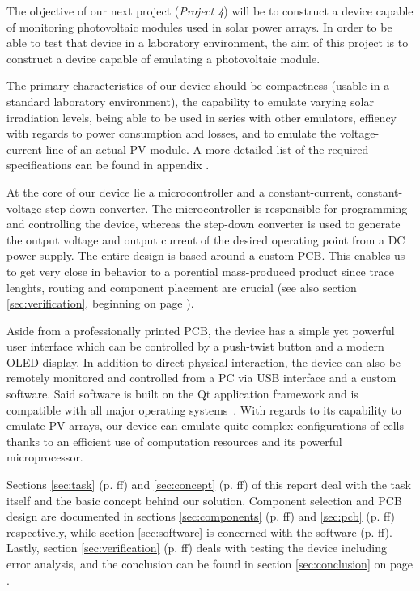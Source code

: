 
The objective  of our next project  (\emph{Project 4}) will be  to construct a
device  capable  of  monitoring  photovoltaic  modules  used  in  solar  power
arrays. In order to  be able to test that device  in a laboratory environment,
the  aim of  this project  is to  construct a  device capable  of emulating  a
photovoltaic module.

The primary characteristics  of our device should be compactness  (usable in a
standard  laboratory environment),  the  capability to  emulate varying  solar
irradiation levels,  being able  to be  used in  series with  other emulators,
effiency with  regards to  power consumption  and losses,  and to  emulate the
voltage-current  line  of  an  actual  PV  module. A  more  detailed  list  of
the  required specifications  can  be  found in  appendix  . %

At  the core  of  our device  lie a  microcontroller  and a  constant-current,
constant-voltage step-down converter.  The  microcontroller is responsible for
programming and  controlling the  device, whereas  the step-down  converter is
used  to  generate the  output  voltage  and  output  current of  the  desired
operating point  from a DC power  supply. The entire design is  based around a
custom  PCB. This enables  us to  get very  close in  behavior to  a porential
mass-produced  product since  trace lenghts,  routing and  component placement
are  crucial  (see  also  section \ref{sec:verification},  beginning  on  page
\pageref{sec:verification}).

Aside from a professionally printed PCB,  the device has a simple yet powerful
user interface  which can be  controlled by a  push-twist button and  a modern
OLED display. In addition to direct  physical interaction, the device can also
be remotely monitored and controlled from a  PC via USB interface and a custom
software. Said  software is  built  on  the Qt  application  framework and  is
compatible with all major operating systems~\cite{ref:qt}. With regards to its
capability  to  emulate  PV  arrays,  our device  can  emulate  quite  complex
configurations of  cells thanks to  an efficient use of  computation resources
and its powerful microprocessor.

Sections  \ref{sec:task}   (p.  \pageref{sec:task}ff)   and  \ref{sec:concept}
(p.   \pageref{sec:concept}ff)   of   this   report   deal   with   the   task
itself  and  the  basic   concept  behind  our  solution. Component  selection
and   PCB  design   are  documented   in  sections   \ref{sec:components}  (p.
\pageref{sec:components}ff)   and   \ref{sec:pcb}   (p.   \pageref{sec:pcb}ff)
respectively, while section \ref{sec:software}  is concerned with the software
(p.  \pageref{sec:software}ff).   Lastly, section  \ref{sec:verification}  (p.
\pageref{sec:verification}ff) deals  with testing  the device  including error
analysis, and the  conclusion can be found in  section \ref{sec:conclusion} on
page \pageref{sec:conclusion}.
